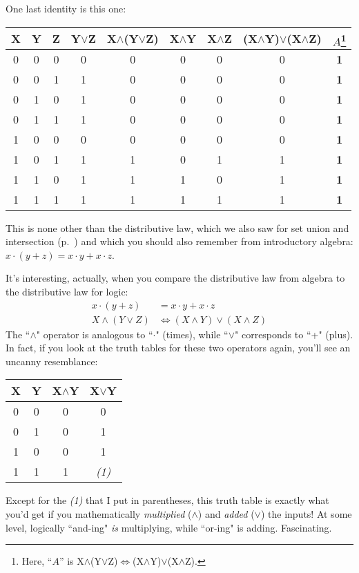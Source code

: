 One last identity is this one:
\footnotesize
{}
\begin{nobreak}
\begin{center}
\begin{tabular}{c c c|c c c c c c}
X & Y & Z & Y$\vee$Z & X$\wedge$(Y$\vee$Z) & X$\wedge$Y & X$\wedge$Z & 
(X$\wedge$Y)$\vee$(X$\wedge$Z) &
$A$\footnote{Here, ``$A$'' is
X$\wedge$(Y$\vee$Z)$\Leftrightarrow$(X$\wedge$Y)$\vee$(X$\wedge$Z).} \\
\hline
0 & 0 & 0 & 0 & 0 & 0 & 0 & 0 & \textbf{1} \\
0 & 0 & 1 & 1 & 0 & 0 & 0 & 0 & \textbf{1} \\
0 & 1 & 0 & 1 & 0 & 0 & 0 & 0 & \textbf{1} \\
0 & 1 & 1 & 1 & 0 & 0 & 0 & 0 & \textbf{1} \\
1 & 0 & 0 & 0 & 0 & 0 & 0 & 0 & \textbf{1} \\
1 & 0 & 1 & 1 & 1 & 0 & 1 & 1 & \textbf{1} \\
1 & 1 & 0 & 1 & 1 & 1 & 0 & 1 & \textbf{1} \\
1 & 1 & 1 & 1 & 1 & 1 & 1 & 1 & \textbf{1} \\
\end{tabular}
\end{center}
\end{nobreak}
\normalsize
{}
This is none other than the distributive law, which we also saw for set
union and intersection (p.~\pageref{distributivelaw}) and which you should
also remember from introductory algebra: $x\cdot(y+z)=x\cdot y+x\cdot z$.

It's interesting, actually, when you compare the distributive law from
algebra to the distributive law for logic:
\begin{align*}
x\cdot(y+z) &= x\cdot y+x\cdot z \\
X\wedge(Y\vee Z) & \Leftrightarrow(X\wedge Y)\vee(X\wedge Z)
\end{align*}
The ``$\wedge$" operator is analogous to ``$\cdot$" (times), while ``$\vee$"
corresponds to ``+" (plus). In fact, if you look at the truth tables for
these two operators again, you'll see an uncanny resemblance:
\begin{nobreak}
\begin{center}
\begin{tabular}{c c|c c}
X & Y & X$\wedge$Y & X$\vee$Y \\
\hline
0 & 0 & 0 & 0 \\
0 & 1 & 0 & 1 \\
1 & 0 & 0 & 1 \\
1 & 1 & 1 & \textit{(1)} \\
\end{tabular}
\end{center}
\end{nobreak}
Except for the \textit{(1)} that I put in parentheses, this truth table is
exactly what you'd get if you mathematically \textit{multiplied} ($\wedge$)
and \textit{added} ($\vee$) the inputs! At some level, logically ``and-ing"
\textit{is} multiplying, while ``or-ing" is adding. Fascinating.


